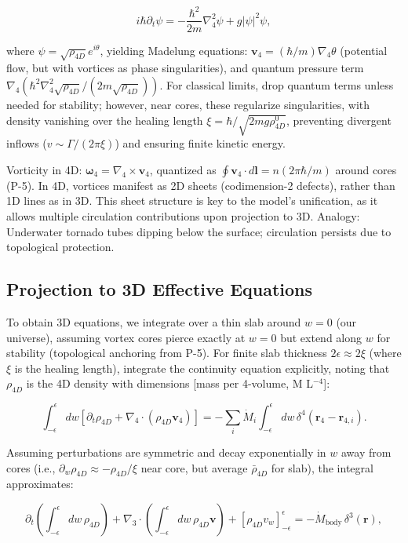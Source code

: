 \documentclass{article}
\begin{document}
\[
i \hbar \partial_t \psi = -\frac{\hbar^2}{2 m} \nabla_4^2 \psi + g |\psi|^2 \psi,
\]

where $\psi = \sqrt{\rho_{4D}} e^{i \theta}$, yielding Madelung equations: $\mathbf{v}_4 = (\hbar / m) \nabla_4 \theta$ (potential flow, but with vortices as phase singularities), and quantum pressure term $\nabla_4 (\hbar^2 \nabla_4^2 \sqrt{\rho_{4D}} / (2 m \sqrt{\rho_{4D}}))$. For classical limits, drop quantum terms unless needed for stability; however, near cores, these regularize singularities, with density vanishing over the healing length $\xi = \hbar / \sqrt{2 m g \rho_{4D}^0}$, preventing divergent inflows ($v \sim \Gamma / (2\pi \xi)$) and ensuring finite kinetic energy.

Vorticity in 4D: $\boldsymbol{\omega}_4 = \nabla_4 \times \mathbf{v}_4$, quantized as $\oint \mathbf{v}_4 \cdot d\mathbf{l} = n (2\pi \hbar / m)$ around cores (P-5). In 4D, vortices manifest as 2D sheets (codimension-2 defects), rather than 1D lines as in 3D. This sheet structure is key to the model's unification, as it allows multiple circulation contributions upon projection to 3D. Analogy: Underwater tornado tubes dipping below the surface; circulation persists due to topological protection.

\subsection{Projection to 3D Effective Equations}

To obtain 3D equations, we integrate over a thin slab around $w=0$ (our universe), assuming vortex cores pierce exactly at $w=0$ but extend along $w$ for stability (topological anchoring from P-5). For finite slab thickness $2\epsilon \approx 2\xi$ (where $\xi$ is the healing length), integrate the continuity equation explicitly, noting that $\rho_{4D}$ is the 4D density with dimensions [mass per 4-volume, M L$^{-4}$]:

\[
\int_{-\epsilon}^{\epsilon} dw \left[ \partial_t \rho_{4D} + \nabla_4 \cdot (\rho_{4D} \mathbf{v}_4) \right] = -\sum_i \dot{M}_i \int_{-\epsilon}^{\epsilon} dw \, \delta^4(\mathbf{r}_4 - \mathbf{r}_{4,i}).
\]

Assuming perturbations are symmetric and decay exponentially in $w$ away from cores (i.e., $\partial_w \rho_{4D} \approx - \rho_{4D} / \xi$ near core, but average $\bar{\rho}_{4D}$ for slab), the integral approximates:

\[
\partial_t \left( \int_{-\epsilon}^{\epsilon} dw \, \rho_{4D} \right) + \nabla_3 \cdot \left( \int_{-\epsilon}^{\epsilon} dw \, \rho_{4D} \mathbf{v} \right) + [\rho_{4D} v_w]_{-\epsilon}^{\epsilon} = -\dot{M}_{\text{body}} \, \delta^3(\mathbf{r}),
\]
\end{document}
